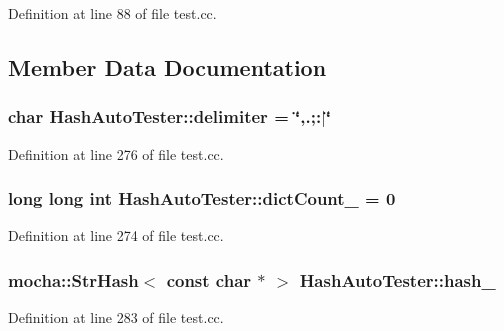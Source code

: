 Definition at line 88 of file test.cc.



\subsection{Member Data Documentation}
\hypertarget{class_hash_auto_tester_a1fba2a89e3d92be80dedec69d26b4804}{
\subsubsection[{delimiter}]{\setlength{\rightskip}{0pt plus 5cm}char {\bf HashAutoTester::delimiter} = \char`\"{},.;:$|$\char`\"{}}}
\label{class_hash_auto_tester_a1fba2a89e3d92be80dedec69d26b4804}


Definition at line 276 of file test.cc.

\hypertarget{class_hash_auto_tester_a8e6aab9fbd4242ef0da4cd17b2d83a71}{
\subsubsection[{dictCount\_\-}]{\setlength{\rightskip}{0pt plus 5cm}long long int {\bf HashAutoTester::dictCount\_\-} = 0}}
\label{class_hash_auto_tester_a8e6aab9fbd4242ef0da4cd17b2d83a71}


Definition at line 274 of file test.cc.

\hypertarget{class_hash_auto_tester_ab194f0824e6b0550a9e2cc1311c18504}{
\subsubsection[{hash\_\-}]{\setlength{\rightskip}{0pt plus 5cm}mocha::StrHash$<$ const char $\ast$ $>$ {\bf HashAutoTester::hash\_\-}}}
\label{class_hash_auto_tester_ab194f0824e6b0550a9e2cc1311c18504}


Definition at line 283 of file test.cc.

